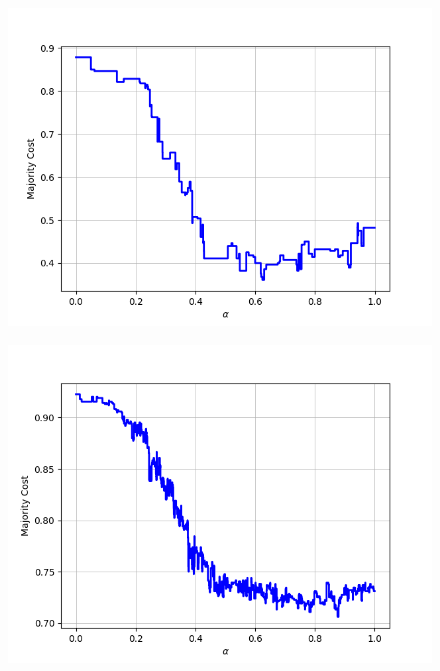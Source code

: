 \begin{figure}[H]
\begin{minipage}{.24\textwidth}
  {\includegraphics[width=\linewidth]{plots/omniglot-intra-sc-cnn/N_Ko}}
\end{minipage}
\begin{minipage}{.24\textwidth}
  \centering
  {\includegraphics[width=\linewidth]{plots/omniglot-intra-sc-cnn/Ojibwe_(Canadian_Aboriginal_Syllabics)}}
\end{minipage}
\begin{minipage}{.24\textwidth}
  \centering

\end{minipage}
\end{figure}
